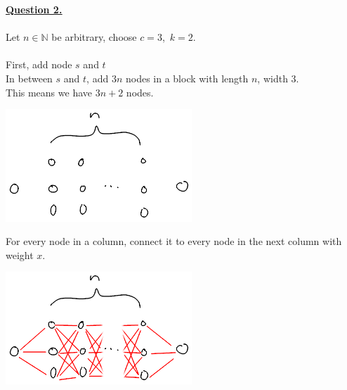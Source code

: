 \documentclass[12pt]{article}
\newcommand{\N}{\mathbb{N}}
\begin{document}
\everymath{\displaystyle} %
\def \imageWidth{7cm}

\noindent \hyperlink{toc}{\hypertarget{2}{\LARGE \underline{\textbf{Question 2.}}}}
\\\\
Let $n\in \N$ be arbitrary, choose $\displaystyle c=3$,\ $k=2$.
\\\\
First, add node $s$ and $t$\\
In between $s$ and $t$, add $3n$ nodes in a block with length $n$, width 3.\\
This means we have $3n + 2$ nodes.
\begin{center}
	\includegraphics[width=\imageWidth]{CSCB63_A2_2-1.png}
\end{center}
For every node in a column, connect it to every node in the next column with weight $x$.
\begin{center}
	\includegraphics[width=\imageWidth]{CSCB63_A2_2-2.png}
\end{center}
\end{document}

